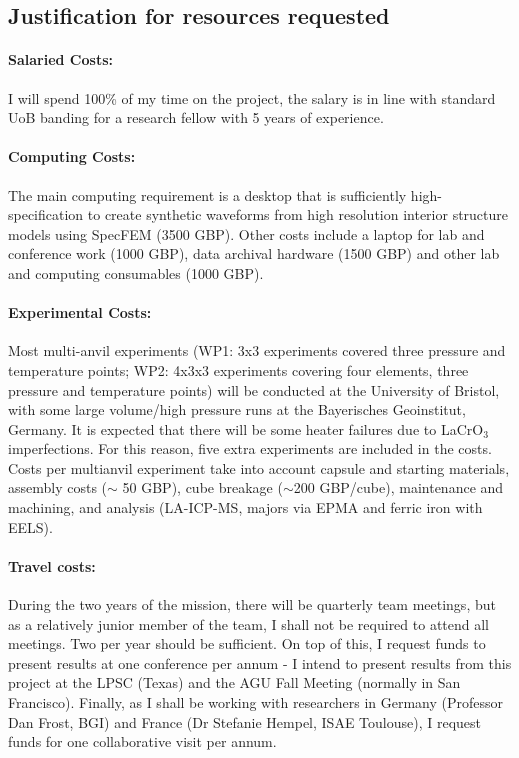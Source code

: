 \documentclass[11pt,twoside,a4paper]{article}
\begin{document}
\subsection*{Justification for resources requested}

\paragraph{Salaried Costs:} I will spend 100\% of my time on the project, the salary is in line with standard UoB banding for a research fellow with 5 years of experience.
\vspace{-1.2em}
\paragraph{Computing Costs:} The main computing requirement is a desktop that is sufficiently high-specification to create synthetic waveforms from high resolution interior structure models using SpecFEM (3500 GBP). Other costs include a laptop for lab and conference work (1000 GBP), data archival hardware (1500 GBP) and other lab and computing consumables (1000 GBP).
\vspace{-1.2em}
\paragraph{Experimental Costs:} Most multi-anvil experiments (WP1: 3x3 experiments covered three pressure and temperature points; WP2: 4x3x3 experiments covering four elements, three pressure and temperature points) will be conducted at the University of Bristol, with some large volume/high pressure runs at the Bayerisches Geoinstitut, Germany. It is expected that there will be some heater failures due to LaCrO$_3$ imperfections. For this reason, five extra experiments are included in the costs. Costs per multianvil experiment take into account capsule and starting materials, assembly costs ($\sim$ 50 GBP), cube breakage ($\sim$200 GBP/cube), maintenance and machining, and analysis (LA-ICP-MS, majors via EPMA and ferric iron with EELS). 
\vspace{-1.2em}
\paragraph{Travel costs:} During the two years of the mission, there will be quarterly team meetings, but as a relatively junior member of the team, I shall not be required to attend all meetings. Two per year should be sufficient. On top of this, I request funds to present results at one conference per annum - I intend to present results from this project at the LPSC (Texas) and the AGU Fall Meeting (normally in San Francisco). Finally, as I shall be working with researchers in Germany (Professor Dan Frost, BGI) and France (Dr Stefanie Hempel, ISAE Toulouse), I request funds for one collaborative visit per annum. 


\clearpage

\end{document}
